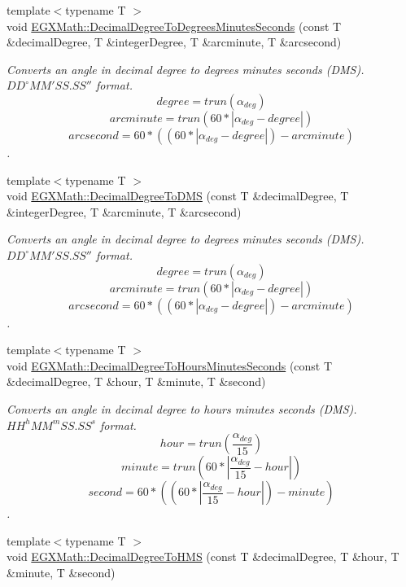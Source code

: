 \begin{DoxyCompactItemize}
{\footnotesize template$<$typename T $>$ }\\void \mbox{\hyperlink{group___e_g_x_math-_angle_conversions-_decimal_degree_gac5a5255c8d120f71b60d8f60de1a1b6e}{E\+G\+X\+Math\+::\+Decimal\+Degree\+To\+Degrees\+Minutes\+Seconds}} (const T \&decimal\+Degree, T \&integer\+Degree, T \&arcminute, T \&arcsecond)
\begin{DoxyCompactList}\small\item\em Converts an angle in decimal degree to degrees minutes seconds (D\+MS). ${DD}^{\circ}{MM}'{SS.SS}''$ format. \[degree=trun(\alpha_{deg})\] \[arcminute=trun(60 * |\alpha_{deg} - degree|)\] \[arcsecond=60 * ((60 * |\alpha_{deg} - degree|)-arcminute)\]. \end{DoxyCompactList}\item 
{\footnotesize template$<$typename T $>$ }\\void \mbox{\hyperlink{group___e_g_x_math-_angle_conversions-_decimal_degree_ga64a1b298ce16e9edf3209b678a7bed46}{E\+G\+X\+Math\+::\+Decimal\+Degree\+To\+D\+MS}} (const T \&decimal\+Degree, T \&integer\+Degree, T \&arcminute, T \&arcsecond)
\begin{DoxyCompactList}\small\item\em Converts an angle in decimal degree to degrees minutes seconds (D\+MS). ${DD}^{\circ}{MM}'{SS.SS}''$ format. \[degree=trun(\alpha_{deg})\] \[arcminute=trun(60 * |\alpha_{deg} - degree|)\] \[arcsecond=60 * ((60 * |\alpha_{deg} - degree|)-arcminute)\]. \end{DoxyCompactList}\item 
{\footnotesize template$<$typename T $>$ }\\void \mbox{\hyperlink{group___e_g_x_math-_angle_conversions-_decimal_degree_gaa3f0b6c7c497882935487ad2d55a0f5a}{E\+G\+X\+Math\+::\+Decimal\+Degree\+To\+Hours\+Minutes\+Seconds}} (const T \&decimal\+Degree, T \&hour, T \&minute, T \&second)
\begin{DoxyCompactList}\small\item\em Converts an angle in decimal degree to hours minutes seconds (D\+MS). ${HH}^{h}{MM}^{m}{SS.SS}^{s}$ format. \[hour=trun(\frac{\alpha_{deg}}{15})\] \[minute=trun(60 * |\frac{\alpha_{deg}}{15} - hour|)\] \[second=60 * ((60 * |\frac{\alpha_{deg}}{15} - hour|)-minute)\]. \end{DoxyCompactList}\item 
{\footnotesize template$<$typename T $>$ }\\void \mbox{\hyperlink{group___e_g_x_math-_angle_conversions-_decimal_degree_ga981b48f16766590641360ca98dfa7b8c}{E\+G\+X\+Math\+::\+Decimal\+Degree\+To\+H\+MS}} (const T \&decimal\+Degree, T \&hour, T \&minute, T \&second)

\end{DoxyCompactItemize}
